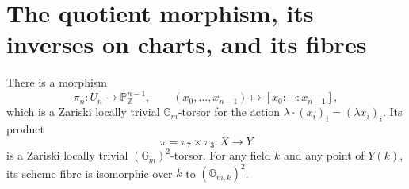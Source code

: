 \section{The quotient morphism, its inverses on charts, and its fibres}
\label{sec:cg-torsor}
\begin{proposition}\label{prop:cg-torsor}
There is a morphism
\[
 \pi_n:U_n\longrightarrow\mathbb P^{n-1}_{\mathbb Z},\qquad
 (x_0,\ldots,x_{n-1})\longmapsto[x_0:\cdots:x_{n-1}],
\]
which is a Zariski locally trivial $\mathbb G_m$-torsor for the action
$\lambda\cdot(x_i)_i=(\lambda x_i)_i$. Its product
\[
 \pi=\pi_7\times\pi_3:X\longrightarrow Y
\]
is a Zariski locally trivial $(\mathbb G_m)^2$-torsor. For any field $k$
and any point of $Y(k)$, its scheme fibre is isomorphic over $k$ to
$(\mathbb G_{m,k})^2$.
\end{proposition}
